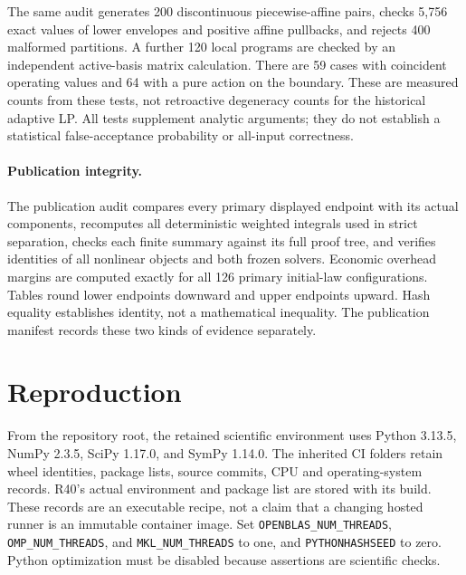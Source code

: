 The same audit generates 200 discontinuous piecewise-affine pairs, checks 5,756 exact values of lower envelopes and positive affine pullbacks, and rejects 400 malformed partitions. A further 120 local programs are checked by an independent active-basis matrix calculation. There are 59 cases with coincident operating values and 64 with a pure action on the boundary. These are measured counts from these tests, not retroactive degeneracy counts for the historical adaptive LP. All tests supplement analytic arguments; they do not establish a statistical false-acceptance probability or all-input correctness.

\paragraph{Publication integrity.} The publication audit compares every primary displayed endpoint with its actual components, recomputes all deterministic weighted integrals used in strict separation, checks each finite summary against its full proof tree, and verifies identities of all nonlinear objects and both frozen solvers. Economic overhead margins are computed exactly for all 126 primary initial-law configurations. Tables round lower endpoints downward and upper endpoints upward. Hash equality establishes identity, not a mathematical inequality. The publication manifest records these two kinds of evidence separately.

\section{Reproduction}
From the repository root, the retained scientific environment uses Python 3.13.5, NumPy 2.3.5, SciPy 1.17.0, and SymPy 1.14.0. The inherited CI folders retain wheel identities, package lists, source commits, CPU and operating-system records. R40's actual environment and package list are stored with its build. These records are an executable recipe, not a claim that a changing hosted runner is an immutable container image. Set \texttt{OPENBLAS\_NUM\_THREADS}, \texttt{OMP\_NUM\_THREADS}, and \texttt{MKL\_NUM\_THREADS} to one, and \texttt{PYTHONHASHSEED} to zero. Python optimization must be disabled because assertions are scientific checks.

